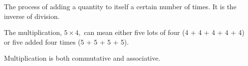 The process of adding a quantity to itself a 
certain number of times.
It is the inverse of division.

\par
The multiplication, \ensuremath{5 \times 4,} can mean either five lots of four                       
(4 + 4 + 4 + 4 + 4) or five added four times (5 + 5 + 5 + 5). 
 
\par
Multiplication is both commutative and associative.
